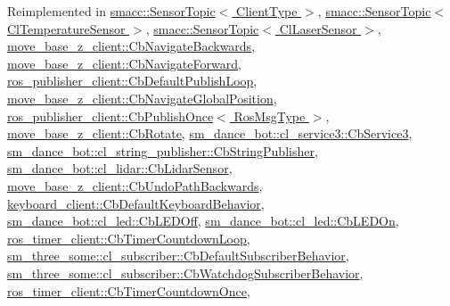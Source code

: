 Reimplemented in \hyperlink{classsmacc_1_1SensorTopic_aa18961f866b7427973acb2660c8e39ee}{smacc\+::\+Sensor\+Topic$<$ Client\+Type $>$}, \hyperlink{classsmacc_1_1SensorTopic_aa18961f866b7427973acb2660c8e39ee}{smacc\+::\+Sensor\+Topic$<$ Cl\+Temperature\+Sensor $>$}, \hyperlink{classsmacc_1_1SensorTopic_aa18961f866b7427973acb2660c8e39ee}{smacc\+::\+Sensor\+Topic$<$ Cl\+Laser\+Sensor $>$}, \hyperlink{classmove__base__z__client_1_1CbNavigateBackwards_ae5c9eb5029e0a6ea6950cb23713214bb}{move\+\_\+base\+\_\+z\+\_\+client\+::\+Cb\+Navigate\+Backwards}, \hyperlink{classmove__base__z__client_1_1CbNavigateForward_a48df166608fd30ad6abfd0fca43caa51}{move\+\_\+base\+\_\+z\+\_\+client\+::\+Cb\+Navigate\+Forward}, \hyperlink{classros__publisher__client_1_1CbDefaultPublishLoop_ada860aab5d8887e8671a6ae7f4b22e76}{ros\+\_\+publisher\+\_\+client\+::\+Cb\+Default\+Publish\+Loop}, \hyperlink{classmove__base__z__client_1_1CbNavigateGlobalPosition_aa91be9e16bb3b67560e97c8d29c384e4}{move\+\_\+base\+\_\+z\+\_\+client\+::\+Cb\+Navigate\+Global\+Position}, \hyperlink{classros__publisher__client_1_1CbPublishOnce_a223cb50cd7e4041d42106eb600575bae}{ros\+\_\+publisher\+\_\+client\+::\+Cb\+Publish\+Once$<$ Ros\+Msg\+Type $>$}, \hyperlink{classmove__base__z__client_1_1CbRotate_ac04e8dece248a97726a533820d15dfbe}{move\+\_\+base\+\_\+z\+\_\+client\+::\+Cb\+Rotate}, \hyperlink{classsm__dance__bot_1_1cl__service3_1_1CbService3_ae9e3796b507ad96cc0890fec0f64a4b7}{sm\+\_\+dance\+\_\+bot\+::cl\+\_\+service3\+::\+Cb\+Service3}, \hyperlink{classsm__dance__bot_1_1cl__string__publisher_1_1CbStringPublisher_a7aa533578e820ee90d92d15b85d42e9b}{sm\+\_\+dance\+\_\+bot\+::cl\+\_\+string\+\_\+publisher\+::\+Cb\+String\+Publisher}, \hyperlink{structsm__dance__bot_1_1cl__lidar_1_1CbLidarSensor_aad3468a6ae78999c9fd01bdb81b42a49}{sm\+\_\+dance\+\_\+bot\+::cl\+\_\+lidar\+::\+Cb\+Lidar\+Sensor}, \hyperlink{classmove__base__z__client_1_1CbUndoPathBackwards_a171b0d1a2943f5aca0647b101695eb71}{move\+\_\+base\+\_\+z\+\_\+client\+::\+Cb\+Undo\+Path\+Backwards}, \hyperlink{classkeyboard__client_1_1CbDefaultKeyboardBehavior_a1ac673a9d9a733215f665810d6cf69aa}{keyboard\+\_\+client\+::\+Cb\+Default\+Keyboard\+Behavior}, \hyperlink{classsm__dance__bot_1_1cl__led_1_1CbLEDOff_a3c0ed097db52baae1928a19936f09a83}{sm\+\_\+dance\+\_\+bot\+::cl\+\_\+led\+::\+Cb\+L\+E\+D\+Off}, \hyperlink{classsm__dance__bot_1_1cl__led_1_1CbLEDOn_a3b7de8585d728becefb8c2c5cc3b6d95}{sm\+\_\+dance\+\_\+bot\+::cl\+\_\+led\+::\+Cb\+L\+E\+D\+On}, \hyperlink{classros__timer__client_1_1CbTimerCountdownLoop_ae547ef69c9ce8029b0f5f27120155c9f}{ros\+\_\+timer\+\_\+client\+::\+Cb\+Timer\+Countdown\+Loop}, \hyperlink{classsm__three__some_1_1cl__subscriber_1_1CbDefaultSubscriberBehavior_a9d1f8dfb490a26b1fcdab1b740436837}{sm\+\_\+three\+\_\+some\+::cl\+\_\+subscriber\+::\+Cb\+Default\+Subscriber\+Behavior}, \hyperlink{classsm__three__some_1_1cl__subscriber_1_1CbWatchdogSubscriberBehavior_a6bd938abf54a95555182345a5e53cafe}{sm\+\_\+three\+\_\+some\+::cl\+\_\+subscriber\+::\+Cb\+Watchdog\+Subscriber\+Behavior}, \hyperlink{classros__timer__client_1_1CbTimerCountdownOnce_a06e15530538aed6ff5b55e75fe979907}{ros\+\_\+timer\+\_\+client\+::\+Cb\+Timer\+Countdown\+Once}, 